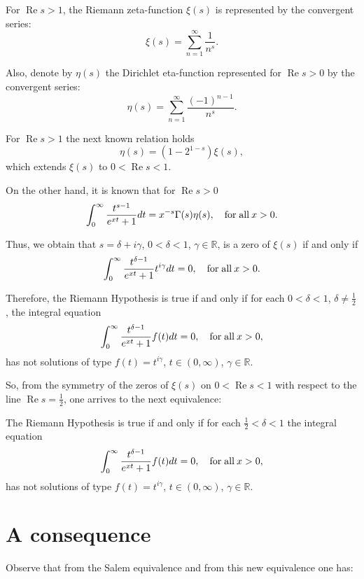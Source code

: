 \documentclass[11pt]{article}
\theoremstyle{remark}
\begin{document}
\hspace{1 cm} For $\operatorname{Re} s>1$, the Riemann zeta-function $\xi (s)$  is represented by the convergent series:
\[
\xi (s)=\sum_{n=1}^{\infty}\frac{1}{n^s} .
\]

Also, denote by $\eta (s)$ the Dirichlet eta-function represented for $\operatorname{Re} s>0$ by the convergent series:
\[
\eta (s)= \sum_{n=1}^{\infty}\frac{(-1)^{n-1}}{n^s} .
\]

For $\operatorname{Re} s >1$ the next known relation holds
\[
\eta (s)=\left( 1- 2^{1-s}\right) \xi (s) ,
\]
which extends $\xi (s)$ to $0<\operatorname{Re} s<1$.

On the other hand, it is known that for $\operatorname{Re} s >0$
\begin{equation}\label{1.1}
\int_{0}^{\infty}\frac{t^{s -1}}{e^{xt}+1}  dt =x^{-s}\Gamma (s) \eta (s) ,\quad \textrm{for\;all} \: x>0.
\end{equation}


Thus, we obtain that $s= \delta + i\gamma$, $0<\delta < 1$, $\gamma\in\mathbb{R}$, is a zero of $\xi (s) $ if and only if 
\[
\int_{0}^{\infty}\frac{t^{\delta -1}}{e^{xt}+1} t^{i\gamma }  dt = 0,\quad \textrm{for\;all}\: x>0.
\]


Therefore, the Riemann Hypothesis is true if and only if for each $0<\delta < 1$, $\delta \neq \frac{1}{2}$, the integral equation
\[
\int_{0}^{\infty}\frac{t^{\delta -1}}{e^{xt}+1} f(t)  dt = 0, \quad \textrm{for\;all}\: x>0,
\]
has not solutions of type $f(t)=t^{i\gamma}$, $t\in (0,\infty )$, $\gamma\in \mathbb{R}$.


So, from the symmetry of the zeros of $\xi (s)$ on $0<\operatorname{Re} s<1$ with respect to the line $\operatorname{Re}  s =\frac{1}{2}$, one arrives to the next equivalence:

The Riemann Hypothesis is true if and only if for each $\frac{1}{2} < \delta < 1$ the integral equation 
\[
\int_{0}^{\infty}\frac{t^{\delta -1}}{e^{xt}+1} f(t)  dt = 0, \quad \textrm{for\;all}\: x>0,
\]
has not solutions of type $f(t)=t^{i\gamma}$, $t \in (0,\infty )$, $\gamma\in \mathbb{R}$.

\section*{A consequence}

\hspace{1 cm} Observe that from the Salem equivalence \cite{Salem} and from this new equivalence one has:
\end{document}
